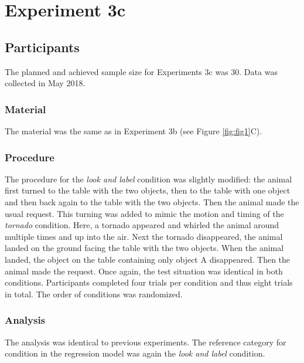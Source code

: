 \documentclass[
  man,floatsintext]{apa6}
\begin{document}
\hypertarget{experiment-3c}{%
\section{Experiment 3c}\label{experiment-3c}}

\hypertarget{participants-5}{%
\subsection{Participants}\label{participants-5}}

The planned and achieved sample size for Experiments 3c was 30. Data was collected in May 2018.

\hypertarget{material-5}{%
\subsubsection{Material}\label{material-5}}

The material was the same as in Experiment 3b (see Figure \ref{fig:fig1}C).

\hypertarget{procedure-5}{%
\subsubsection{Procedure}\label{procedure-5}}

The procedure for the \emph{look and label} condition was slightly modified: the animal first turned to the table with the two objects, then to the table with one object and then back again to the table with the two objects. Then the animal made the usual request. This turning was added to mimic the motion and timing of the \emph{tornado} condition. Here, a tornado appeared and whirled the animal around multiple times and up into the air. Next the tornado disappeared, the animal landed on the ground facing the table with the two objects. When the animal landed, the object on the table containing only object A disappeared. Then the animal made the request. Once again, the test situation was identical in both conditions. Participants completed four trials per condition and thus eight trials in total. The order of conditions was randomized.

\hypertarget{analysis-5}{%
\subsubsection{Analysis}\label{analysis-5}}

The analysis was identical to previous experiments. The reference category for condition in the regression model was again the \emph{look and label} condition.
\end{document}
